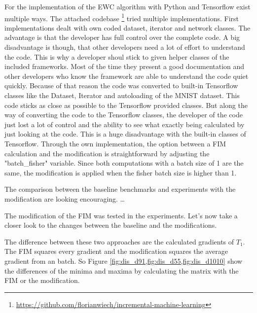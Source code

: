 For the implementation of the EWC algorithm with Python and Tensorflow exist multiple ways.
The attached codebase \footnote{\url{https://github.com/florianwiech/incremental-machine-learning}} tried multiple implementations.
First implementations dealt with own coded dataset, iterator and network classes.
The advantage is that the developer has full control over the complete code.
A big disadvantage is though, that other developers need a lot of effort to understand the code.
This is why a developer shoul stick to given helper classes of the included frameworks.
Most of the time they present a good documentation and other developers who know the framework are able to understand the code quiet quickly.
Because of that reason the code was converted to built-in Tensorflow classes like the Dataset, Iterator and autoloading of the MNIST dataset.
This code sticks as close as possible to the Tensorflow provided classes.
But along the way of converting the code to the Tensorflow classes, the developer of the code just lost a lot of control and the ability to see what exactly being calculated by just looking at the code.
This is a huge disadvantage with the built-in classes of Tensorflow.
\newline
Through the own implementation, the option between a FIM calculation and the modification is straightforward by adjusting the "batch\_fisher" variable.
Since both computations with a batch size of 1 are the same, the modification is applied when the fisher batch size is higher than 1.

The comparison between the baseline benchmarks and experiments with the modification are looking encouraging.
…




\iffalse
The modification of the FIM was tested in the experiments.
Let's now take a closer look to the changes between the baseline and the modifications.

The difference between these two approaches are the calculated gradients of $T_1$.
The FIM squares every gradient and the modification squares the average gradient from an batch.
So Figure \ref{fig:dis_d91,fig:dis_d55,fig:dis_d1010} show the differences of the minima and maxima by calculating the matrix with the FIM or the modification.



